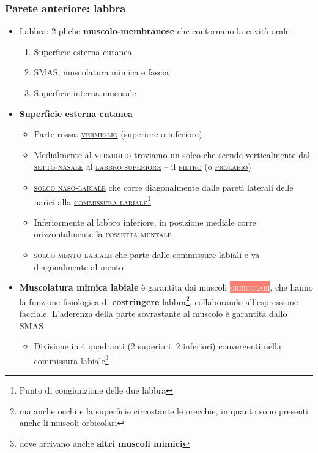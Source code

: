 \documentclass[italian,]{article}
\providecommand{\tightlist}{%
  \setlength{\itemsep}{0pt}\setlength{\parskip}{0pt}}
\newcommand{\mus}[1]{\colorbox{Salmon}{\textcolor{white}{\textsc{#1}}}}
\renewcommand{\a}[1]{\underline{\textsc{#1}}}
\begin{document}
\hypertarget{parete-anteriore-labbra}{%
\subsubsection{Parete anteriore: labbra}\label{parete-anteriore-labbra}}

\begin{itemize}
\tightlist
\item
  Labbra: 2 pliche \textbf{muscolo-membranose} che contornano la cavità
  orale

  \begin{enumerate}
  \def\labelenumi{\arabic{enumi}.}
  \tightlist
  \item
    Superficie esterna cutanea
  \item
    SMAS, muscolatura mimica e fascia
  \item
    Superficie interna mucosale
  \end{enumerate}
\item
  \textbf{Superficie esterna cutanea}

  \begin{itemize}
  \tightlist
  \item
    Parte rossa: \a{vermiglio} (superiore o inferiore)
  \item
    Medialmente al \a{vermiglio} troviamo un solco che scende
    verticalmente dal \a{setto nasale} al \a{labbro superiore} -- il
    \a{filtro} (o \a{prolabio})
  \item
    \a{solco naso-labiale} che corre diagonalmente dalle pareti laterali
    delle narici alla \a{commissura labiale}\footnote{Punto di
      congiunzione delle due labbra}
  \item
    Inferiormente al labbro inferiore, in posizione mediale corre
    orizzontalmente la \a{fossetta mentale}
  \item
    \a{solco mento-labiale} che parte dalle commissure labiali e va
    diagonalmente al mento
  \end{itemize}
\item
  \textbf{Muscolatura mimica labiale} è garantita dai muscoli
  \mus{orbicolari}, che hanno la funzione fisiologica di
  \textbf{costringere} labbra\footnote{ma anche occhi e la superficie
    circostante le orecchie, in quanto sono presenti anche lì muscoli
    orbicolari}, collaborando all'espressione facciale. L'aderenza della
  parte sovrastante al muscolo è garantita dallo SMAS

  \begin{itemize}
  \tightlist
  \item
    Divisione in 4 quadranti (2 superiori, 2 inferiori) convergenti
    nella commissura labiale\footnote{dove arrivano anche \textbf{altri
      muscoli mimici}

}
\end{itemize}
\end{itemize}
\end{document}

